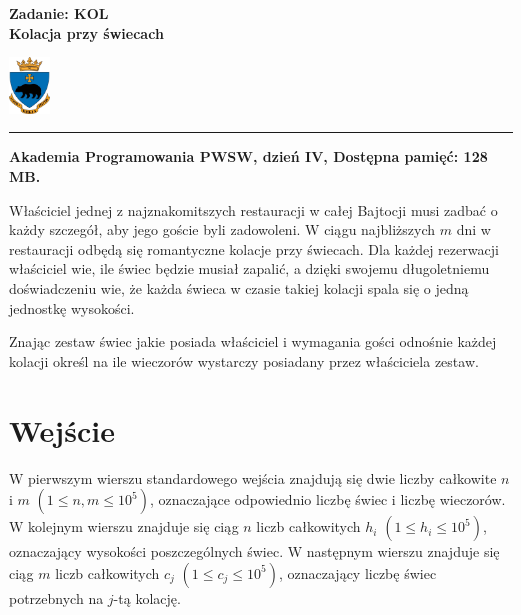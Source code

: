 \documentclass[10pt]{article}
\begin{document}
    

    \noindent
    \begin{minipage}{0.5\textwidth}
        \LARGE{\textsf{\textbf{Zadanie: KOL\\Kolacja przy świecach}}}
    \end{minipage}
    \begin{minipage}{0.5\textwidth}
        \begin{flushright}
            \includegraphics[height=1.5cm]{logo.jpg}
        \end{flushright}
    \end{minipage}
    
    \noindent\rule{\textwidth}{0.4pt}
    
    \noindent\textbf{Akademia Programowania PWSW, dzień IV, Dostępna pamięć: 128 MB.}
    \vspace{1em}
    
    
    \noindent
    Właściciel jednej z najznakomitszych restauracji w całej Bajtocji musi zadbać o każdy szczegół, aby jego goście byli zadowoleni. W ciągu najbliższych $m$ dni w restauracji odbędą się romantyczne kolacje przy świecach. Dla każdej rezerwacji właściciel wie, ile świec będzie musiał zapalić, a dzięki swojemu długoletniemu doświadczeniu wie, że każda świeca w czasie takiej kolacji spala się o jedną jednostkę wysokości.
    
    Znając zestaw świec jakie posiada właściciel i wymagania gości odnośnie każdej kolacji określ na ile wieczorów wystarczy posiadany przez właściciela zestaw.


    \section*{Wejście}
    
    W pierwszym wierszu standardowego wejścia znajdują się dwie liczby całkowite $n$ i $m$ $(1\leq n, m\leq 10^{5})$, oznaczające odpowiednio liczbę świec i liczbę wieczorów. W kolejnym wierszu znajduje się ciąg $n$ liczb całkowitych $h_{i}$ $(1\leq h_{i}\leq 10^{5})$, oznaczający wysokości poszczególnych świec. W następnym wierszu znajduje się ciąg $m$ liczb całkowitych $c_{j}$ $(1\leq c_{j}\leq 10^{5})$, oznaczający liczbę świec potrzebnych na $j$-tą kolację.
\end{document}
